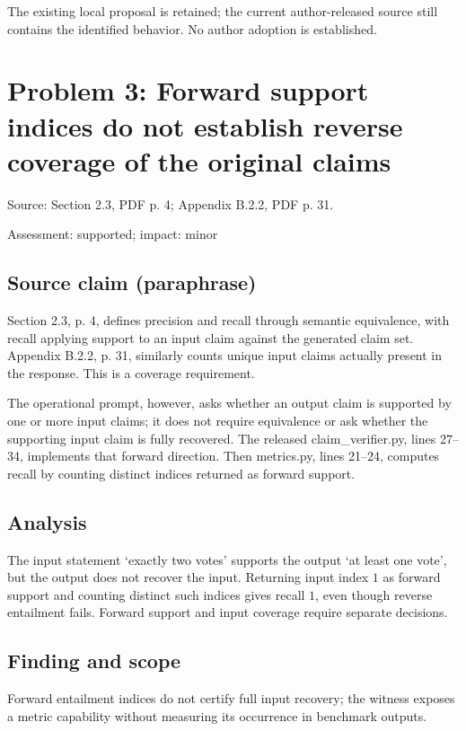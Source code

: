 \documentclass[11pt]{article}
\begin{document}
The existing local proposal is retained; the current author-released source still contains the identified behavior. No author adoption is established.

\section*{Problem 3: Forward support indices do not establish reverse coverage of the original claims}

Source: Section 2.3, PDF p. 4; Appendix B.2.2, PDF p. 31.

Assessment: supported; impact: minor

\subsection*{Source claim (paraphrase)}

Section 2.3, p. 4, defines precision and recall through semantic equivalence, with recall applying support to an input claim against the generated claim set. Appendix B.2.2, p. 31, similarly counts unique input claims actually present in the response. This is a coverage requirement.

The operational prompt, however, asks whether an output claim is supported by one or more input claims; it does not require equivalence or ask whether the supporting input claim is fully recovered. The released claim\_verifier.py, lines 27–34, implements that forward direction. Then metrics.py, lines 21–24, computes recall by counting distinct indices returned as forward support.

\subsection*{Analysis}

The input statement ‘exactly two votes’ supports the output ‘at least one vote’, but the output does not recover the input. Returning input index \(1\) as forward support and counting distinct such indices gives recall \(1\), even though reverse entailment fails. Forward support and input coverage require separate decisions.

\subsection*{Finding and scope}

Forward entailment indices do not certify full input recovery; the witness exposes a metric capability without measuring its occurrence in benchmark outputs.
\end{document}
